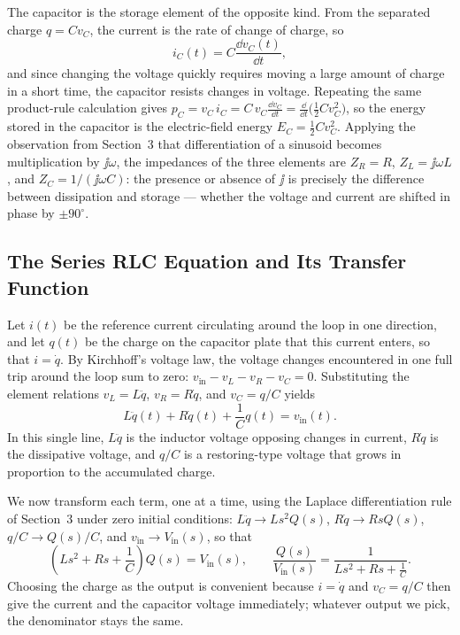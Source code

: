 The capacitor is the storage element of the opposite kind.
From the separated charge $q = C v_C$, the current is the rate of change
of charge, so
\begin{equation}
  i_C(t) = C\frac{\dd v_C(t)}{\dd t},
  \label{eq:u5-cap-i}
\end{equation}
and since changing the voltage quickly requires moving a large amount of
charge in a short time, the capacitor resists changes in voltage.
Repeating the same product-rule calculation gives
$p_C = v_C\,i_C = C\,v_C\frac{\dd v_C}{\dd t}
= \frac{\dd}{\dd t}\bigl(\tfrac{1}{2}C v_C^2\bigr)$,
so the energy stored in the capacitor is the electric-field energy
$E_C = \frac{1}{2}Cv_C^2$.
Applying the observation from Section~3 that differentiation of a sinusoid
becomes multiplication by $\jj\omega$, the impedances of the three
elements are $Z_R = R$, $Z_L = \jj\omega L$, and $Z_C = 1/(\jj\omega C)$:
the presence or absence of $\jj$ is precisely the difference between
dissipation and storage --- whether the voltage and current are shifted in
phase by $\pm 90^\circ$.

\subsection{The Series RLC Equation and Its Transfer Function}

Let $i(t)$ be the reference current circulating around the loop in one
direction, and let $q(t)$ be the charge on the capacitor plate that this
current enters, so that $i = \dot{q}$.
By Kirchhoff's voltage law, the voltage changes encountered in one full
trip around the loop sum to zero:
$v_{\mathrm{in}} - v_L - v_R - v_C = 0$.
Substituting the element relations $v_L = L\ddot{q}$, $v_R = R\dot{q}$,
and $v_C = q/C$ yields
\begin{equation}
  L\ddot{q}(t) + R\dot{q}(t) + \frac{1}{C}q(t) = v_{\mathrm{in}}(t).
  \label{eq:u5-rlc-ode}
\end{equation}
In this single line, $L\ddot{q}$ is the inductor voltage opposing changes
in current, $R\dot{q}$ is the dissipative voltage, and $q/C$ is a
restoring-type voltage that grows in proportion to the accumulated charge.

We now transform each term, one at a time, using the Laplace
differentiation rule of Section~3 under zero initial conditions:
$L\ddot{q} \to L s^2 Q(s)$, $R\dot{q} \to R s Q(s)$,
$q/C \to Q(s)/C$, and $v_{\mathrm{in}} \to V_{\mathrm{in}}(s)$, so that
\begin{equation}
  \left(L s^2 + R s + \frac{1}{C}\right) Q(s) = V_{\mathrm{in}}(s),
  \qquad
  \frac{Q(s)}{V_{\mathrm{in}}(s)} = \frac{1}{L s^2 + R s + \frac{1}{C}}.
  \label{eq:u5-rlc-tf}
\end{equation}
Choosing the charge as the output is convenient because $i = \dot{q}$ and
$v_C = q/C$ then give the current and the capacitor voltage immediately;
whatever output we pick, the denominator stays the same.

